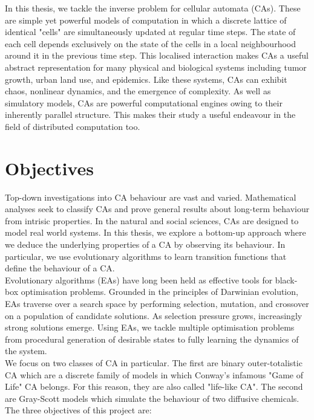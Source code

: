 In this thesis, we tackle the inverse problem for cellular automata (CAs). These are simple yet powerful models of computation in which a discrete lattice of identical "cells" are simultaneously updated at regular time steps. The state of each cell depends exclusively on the state of the cells in a local neighbourhood around it in the previous time step. This localised interaction makes CAs a useful abstract representation for many physical and biological systems including tumor growth\cite{deutsch2021bio, reher2017cell}, urban land use\cite{white2000high}, and epidemics\cite{white2007modeling}. Like these systems, CAs can exhibit chaos, nonlinear dynamics, and the emergence of complexity. As well as simulatory models, CAs are powerful computational engines owing to their inherently parallel structure. This makes their study a useful endeavour in the field of distributed computation too\cite{tosic2005cellular}.\\


\section{Objectives}

Top-down investigations into CA behaviour are vast and varied\cite{packard1985two, wolfram2002,eppstein2010growth}. Mathematical analyses seek to classify CAs and prove general results about long-term behaviour from intrisic properties. In the natural and social sciences, CAs are designed to model real world systems. In this thesis, we explore a bottom-up approach where we deduce the underlying properties of a CA by observing its behaviour. In particular, we use evolutionary algorithms to learn transition functions that define the behaviour of a CA.\\

Evolutionary algorithms (EAs) have long been held as effective tools for black-box optimisation problems. Grounded in the principles of Darwinian evolution, EAs traverse over a search space by performing selection, mutation, and crossover on a population of candidate solutions. As selection pressure grows, increasingly strong solutions emerge. Using EAs, we tackle multiple optimisation problems from procedural generation of desirable states to fully learning the dynamics of the system.\\

We focus on two classes of CA in particular. The first are binary outer-totalistic CA which are a discrete family of models in which Conway's infamous "Game of Life" CA belongs. For this reason, they are also called "life-like CA". The second are Gray-Scott models which simulate the behaviour of two diffusive chemicals. The three objectives of this project are:

